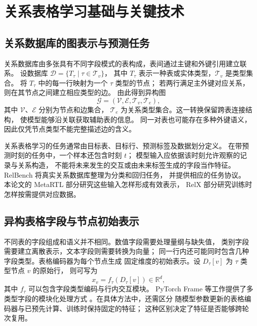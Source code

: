 
\chapter{关系表格学习基础与关键技术}
\label{chap:background}

\section{关系数据库的图表示与预测任务}

关系数据库由多张具有不同字段模式的表构成，表间通过主键和外键引用建立联系。
设数据库 $\mathcal D=\{T_\tau\mid \tau\in\mathcal T_v\}$，
其中 $T_\tau$ 表示一种表或实体类型，$\mathcal T_v$ 是类型集合。
将 $T_\tau$ 中的每一行映射为一个 $\tau$ 类型的节点；
若两行满足主外键对应关系，则在其节点之间建立相应类型的边。
由此得到异构图
\begin{equation}
  \mathcal G=(\mathcal V,\mathcal E,\mathcal T_v,\mathcal T_e),
  \label{eq:background-graph}
\end{equation}
其中 $\mathcal V$、$\mathcal E$ 分别为节点和边集合，
$\mathcal T_e$ 为关系类型集合。这一转换保留跨表连接结构，
使模型能够沿关联获取辅助表的信息\cite{fey2024rdl}。
同一对表也可能存在多种外键语义，因此仅凭节点类型不能完整描述边的含义。

关系表格学习的任务通常由目标表、目标行、预测标签及数据划分定义。
在带预测时刻的任务中，一个样本还包含时刻 $t$；
模型输入应依据该时刻允许观察的记录与关系构造，
不能将未来发生的交互或由未来标签生成的字段当作特征。
RelBench 将真实关系数据库整理为分类和回归任务，
并提供相应的任务协议\cite{robinson2024relbench}。
本论文的 MetaRTL 部分研究这些输入怎样形成有效表示，
RelX 部分研究训练时怎样按需提供对应数据。

\section{异构表格字段与节点初始表示}

不同表的字段组成和语义并不相同。数值字段需要处理量纲与缺失值，
类别字段需要建立离散表示，文本字段则需要转换为向量；
同一行内还可能同时包含几种字段类型。表格编码器为每个节点生成
固定维度的初始表示。设 $D_\tau[v]$ 为 $\tau$ 类型节点 $v$ 的原始行，
则可写为
\begin{equation}
  x_v=f_\tau(D_\tau[v])\in\mathbb R^d,
  \label{eq:background-table-encoder}
\end{equation}
其中 $f_\tau$ 可以包含字段类型编码与行内交互模块。
PyTorch Frame 等工作提供了多类型字段的模块化处理方式
\cite{hu2024pytorchframe}。在具体方法中，还需区分
随模型参数更新的表格编码器与已预先计算、训练时保持固定的特征；
这种区别决定了特征是否能够跨轮次复用。

